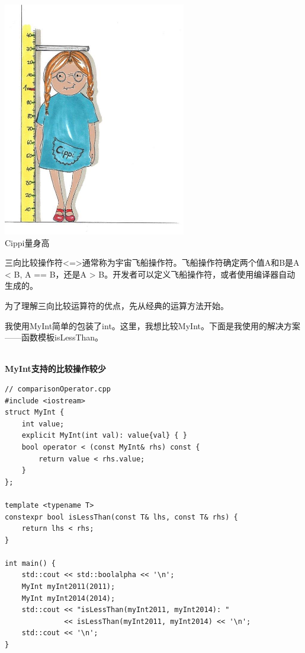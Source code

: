 
\begin{center}
\includegraphics[width=0.6\textwidth]{content/3/chapter4/images/26.png}\\
Cippi量身高
\end{center}

三向比较操作符<=>通常称为宇宙飞船操作符。飞船操作符确定两个值A和B是A < B, A == B，还是A > B。开发者可以定义飞船操作符，或者使用编译器自动生成的。

为了理解三向比较运算符的优点，先从经典的运算方法开始。


我使用MyInt简单的包装了int。这里，我想比较MyInt。下面是我使用的解决方案——函数模板isLessThan。

\hspace*{\fill} \\ %
\noindent
\textbf{MyInt支持的比较操作较少}
\begin{lstlisting}[style=styleCXX]
// comparisonOperator.cpp
#include <iostream>
struct MyInt {
	int value;
	explicit MyInt(int val): value{val} { }
	bool operator < (const MyInt& rhs) const {
		return value < rhs.value;
	}
};

template <typename T>
constexpr bool isLessThan(const T& lhs, const T& rhs) {
	return lhs < rhs;
}

int main() {
	std::cout << std::boolalpha << '\n';
	MyInt myInt2011(2011);
	MyInt myInt2014(2014);
	std::cout << "isLessThan(myInt2011, myInt2014): "
			  << isLessThan(myInt2011, myInt2014) << '\n';
	std::cout << '\n';
}
\end{lstlisting}

